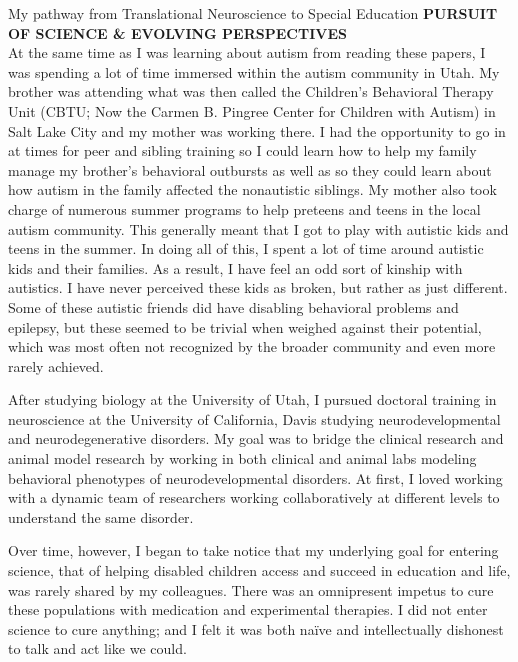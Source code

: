 \documentclass{resume} %
\begin{document}
\begin{rSection}{My pathway from Translational Neuroscience to Special Education}
{\bf PURSUIT OF SCIENCE \& EVOLVING PERSPECTIVES}\\
At the same time as I was learning about autism from reading these papers, I was spending a lot of time immersed within the autism community in Utah. My brother was attending what was then called the Children’s Behavioral Therapy Unit (CBTU; Now the Carmen B. Pingree Center for Children with Autism) in Salt Lake City and my mother was working there. I had the opportunity to go in at times for peer and sibling training so I could learn how to help my family manage my brother’s behavioral outbursts as well as so they could learn about how autism in the family affected the nonautistic siblings. My mother also took charge of numerous summer programs to help preteens and teens in the local autism community. This generally meant that I got to play with autistic kids and teens in the summer. In doing all of this, I spent a lot of time around autistic kids and their families. As a result, I have feel an odd sort of kinship with autistics. I have never perceived these kids as broken, but rather as just different. Some of these autistic friends did have disabling behavioral problems and epilepsy, but these seemed to be trivial when weighed against their potential, which was most often not recognized by the broader community and even more rarely achieved.

After studying biology at the University of Utah, I pursued doctoral training in neuroscience at the University of California, Davis studying neurodevelopmental and neurodegenerative disorders. My goal was to bridge the clinical research and animal model research by working in both clinical and animal labs modeling behavioral phenotypes of neurodevelopmental disorders. At first, I loved working with a dynamic team of researchers working collaboratively at different levels to understand the same disorder. 

Over time, however, I began to take notice that my underlying goal for entering science, that of helping disabled children access and succeed in education and life, was rarely shared by my colleagues. There was an omnipresent impetus to cure these populations with medication and experimental therapies. I did not enter science to cure anything; and I felt it was both naïve and intellectually dishonest to talk and act like we could.
\end{rSection}
\end{document}
